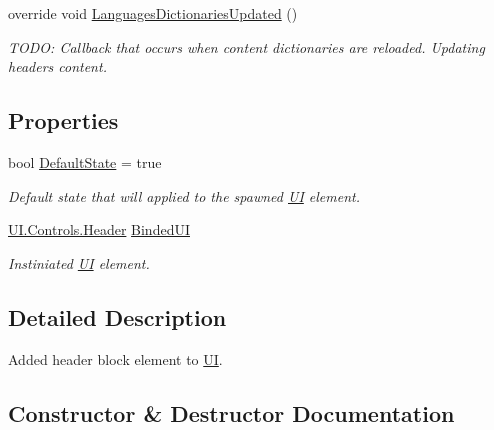 \begin{DoxyCompactItemize}
override void \mbox{\hyperlink{class_wpf_handler_1_1_u_i_1_1_auto_layout_1_1_controls_1_1_header_attribute_ae2587a69606cda16cc87e901140f113a}{Languages\+Dictionaries\+Updated}} ()
\begin{DoxyCompactList}\small\item\em T\+O\+DO\+: Callback that occurs when content dictionaries are reloaded. Updating header\textquotesingle{}s content. \end{DoxyCompactList}\end{DoxyCompactItemize}
\subsection*{Properties}
\begin{DoxyCompactItemize}
\item 
bool \mbox{\hyperlink{class_wpf_handler_1_1_u_i_1_1_auto_layout_1_1_controls_1_1_header_attribute_a37e39441398bd5aa132da26eb23e9349}{Default\+State}} = true
\begin{DoxyCompactList}\small\item\em Default state that will applied to the spawned \mbox{\hyperlink{namespace_wpf_handler_1_1_u_i}{UI}} element. \end{DoxyCompactList}\item 
\mbox{\hyperlink{class_wpf_handler_1_1_u_i_1_1_controls_1_1_header}{U\+I.\+Controls.\+Header}} \mbox{\hyperlink{class_wpf_handler_1_1_u_i_1_1_auto_layout_1_1_controls_1_1_header_attribute_a27af4560ad16335bf2c210692949c1c5}{Binded\+UI}}
\begin{DoxyCompactList}\small\item\em Instiniated \mbox{\hyperlink{namespace_wpf_handler_1_1_u_i}{UI}} element. \end{DoxyCompactList}\end{DoxyCompactItemize}


\subsection{Detailed Description}
Added header block element to \mbox{\hyperlink{namespace_wpf_handler_1_1_u_i}{UI}}. 



\subsection{Constructor \& Destructor Documentation}
\mbox{\label{class_wpf_handler_1_1_u_i_1_1_auto_layout_1_1_controls_1_1_header_attribute_a0c0c74638fa9192803be651427641a7c}} 

